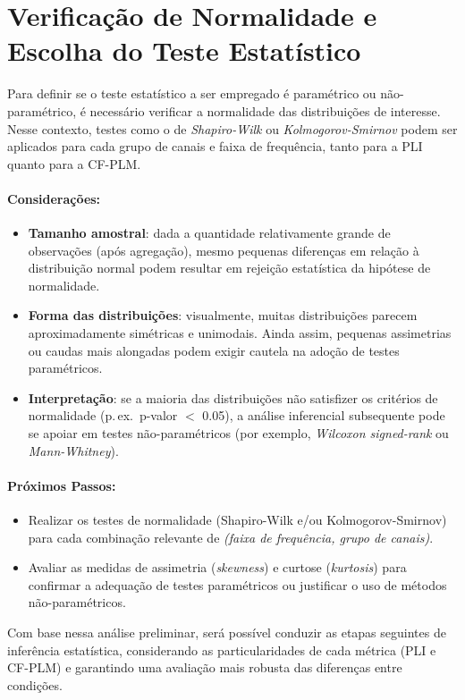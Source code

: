 \section{Verificação de Normalidade e Escolha do Teste Estatístico}
Para definir se o teste estatístico a ser empregado é paramétrico ou não-paramétrico, é necessário verificar a normalidade das distribuições de interesse. Nesse contexto, testes como o de \emph{Shapiro-Wilk} ou \emph{Kolmogorov-Smirnov} podem ser aplicados para cada grupo de canais e faixa de frequência, tanto para a PLI quanto para a CF-PLM.

\paragraph{Considerações:}
\begin{itemize}
    \item \textbf{Tamanho amostral}: dada a quantidade relativamente grande de observações (após agregação), mesmo pequenas diferenças em relação à distribuição normal podem resultar em rejeição estatística da hipótese de normalidade.
    \item \textbf{Forma das distribuições}: visualmente, muitas distribuições parecem aproximadamente simétricas e unimodais. Ainda assim, pequenas assimetrias ou caudas mais alongadas podem exigir cautela na adoção de testes paramétricos.
    \item \textbf{Interpretação}: se a maioria das distribuições não satisfizer os critérios de normalidade (p.\,ex.\ p-valor $<$ 0.05), a análise inferencial subsequente pode se apoiar em testes não-paramétricos (por exemplo, \emph{Wilcoxon signed-rank} ou \emph{Mann-Whitney}).
\end{itemize}

\paragraph{Próximos Passos:}
\begin{itemize}
    \item Realizar os testes de normalidade (Shapiro-Wilk e/ou Kolmogorov-Smirnov) para cada combinação relevante de \emph{(faixa de frequência, grupo de canais)}.
    \item Avaliar as medidas de assimetria (\emph{skewness}) e curtose (\emph{kurtosis}) para confirmar a adequação de testes paramétricos ou justificar o uso de métodos não-paramétricos.
\end{itemize}

Com base nessa análise preliminar, será possível conduzir as etapas seguintes de inferência estatística, considerando as particularidades de cada métrica (PLI e CF-PLM) e garantindo uma avaliação mais robusta das diferenças entre condições.

